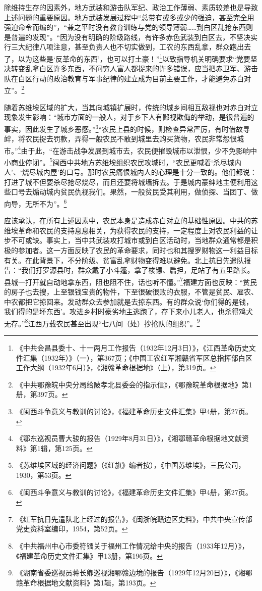除维持生存的因素外，地方武装和游击队军纪、政治工作薄弱、素质较差也是导致上述问题的重要原因。地方武装发展过程中“总带有或多或少的强迫，甚至完全用强迫命令而编的”，“兼之平时没有教育训练与党的领导薄弱……到白区乱抢东西则是普遍的发现”。“因为没有明确的阶级路线，有许多赤色武装到白区去，不坚决实行三大纪律八项注意，甚至负责人也不切实做到，工农的东西乱拿，群众跑出去了，以为这些是‘反革命的东西’，也可以打土豪！”\footnote{《中共会昌县委十、十一两月工作报告（1932年12月3日）》，《江西革命历史文件汇集（1932年）》（一），第367页；《中国工农红军湘赣省军区总指挥部白区工作大纲（1932年6月）》，《湘赣革命根据地》（上），第319页。}以致指导机关明确要求“党要坚决转变乱拿白区许多东西，不问穷人富人都捉来的许多错误，应当把赤卫军、游击队在白区行动的政治教育与军事纪律的建立成为目前主要工作，才能避免赤白对立”。\footnote{《中共鄂豫皖中央分局给陂孝北县委会的指示信》，《鄂豫皖革命根据地》第1册，第397页。}


随着苏维埃区域的扩大，当其向城镇扩展时，传统的城乡间相互敌视也对赤白对立现象发生影响：“城市方面的一般人，对于乡下人有鄙视欺侮的举动，是很普遍的事实，因此发生了城乡恶感。”\footnote{《闽西斗争意义与教训的讨论》，《福建革命历史文件汇集》甲4册，第27页。}“农民上县的时候，则检查异常严厉，有时借故寻衅，将农民捉去罚款，弄得一般农民不敢到城里去购买货物，农民非常怨恨城市。”\footnote{《鄂东巡视员曹大骏的报告（1929年8月31日）》，《湘鄂赣革命根据地文献资料》第1辑，第125页。}由于此，“在游击战争发展到城市去，农民便摧毁城市以泄恨，少不免影响中小商业停闭”。\footnote{《苏维埃区域的经济问题》（《红旗》编者按），《中国苏维埃》，三民公司，1930，第53页。}闽西中共地方苏维埃组织农民攻城时，“农民更喊着‘杀尽城内人’、‘烧尽城内屋’的口号。那时农民痛恨城内人的心理是十分一致的。他们都说：打进了城不但要杀尽抢尽烧尽，而且还要将城墙拆去。于是城内豪绅地主便利用这些口号去煽动城内贫民仇视我们。果然，一般贫民受其利用，做侦探、当团丁、做向导，无所不为”。\footnote{《闽西斗争意义与教训的讨论》，《福建革命历史文件汇集》甲4册，第27页。}


应该承认，在所有上述因素中，农民本身是造成赤白对立的基础性原因。中共的苏维埃革命和农民的支持息息相关，为获得农民的支持，一定程度上对农民利益的让步不可或缺。事实上，当中共武装攻打城市或到白区活动时，当地群众通常都是积极的参加者。这一方面反映了农民的革命要求，同时也和其搜罗财物这一利益目标有关。在此背景下，不分阶级、贫富乱拿财物变得难以避免。北上抗日先遣队报告：“我们打罗源县时，群众戴了小斗篷，拿了梭镖、扁担，足站了有五里路长。县城一打开就自动地拿东西，阻也阻不住，话也听不懂。”\footnote{《红军抗日先遣队北上经过的报告》，《闽浙皖赣边区史料》，中共中央宣传部党史资料室编印，1954，第52页。}福建方面也反映：“贫民的房子也去搜，上至银钱宝贵的物件，下至很破很败的衣服，不管是贫民、雇农、中农都把它掠回来。发动群众去参加就是去掠东西。有的群众说‘你们得的是钱，我们得的是坏东西’。攻进乡村时豪劣地主逃跑了，存下来小儿老人，也杀得鸡犬无存。”\footnote{《中共福州中心市委符镭关于福州工作情况给中央的报告（1933年12月）》，《福建革命历史文件汇集》甲13册，第196页。}江西万载农民甚至出现“七八间（处）抄抢队的组织”。\footnote{《湖南省委巡视员蒋长卿巡视湘鄂赣边境的报告（1929年12月20日）》，《湘鄂赣革命根据地文献资料》第1辑，第193页。}



